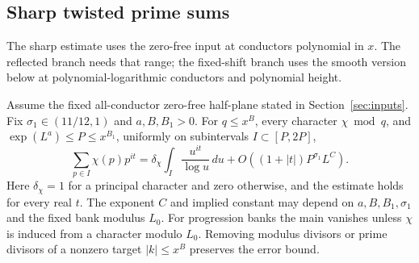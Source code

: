 \subsection{Sharp twisted prime sums}


The sharp estimate uses the zero-free input at conductors polynomial
in \(x\). The reflected branch needs that range; the fixed-shift
branch uses the smooth version below at polynomial-logarithmic
conductors and polynomial height.

\begin{lemma}\label{lem:gr-primes}
Assume the fixed all-conductor zero-free half-plane stated in
Section~\ref{sec:inputs}.
Fix \(\sigma_1\in(11/12,1)\) and \(a,B,B_1>0\).
For \(q\le x^B\), every character \(\chi\bmod q\), and
\(\exp(L^a)\le P\le x^{B_1}\), uniformly on subintervals
\(I\subset[P,2P]\),
\begin{equation}
 \sum_{p\in I}\chi(p)p^{it}
 =\delta_\chi\int_I\frac{u^{it}}{\log u}\,du
       +O((1+|t|)P^{\sigma_1}L^C).                  \label{eq:gr-primes}
\end{equation}
Here \(\delta_\chi=1\) for a principal character and zero otherwise,
and the estimate holds for every real \(t\). The exponent \(C\)
and implied constant may depend on \(a,B,B_1,\sigma_1\) and the
fixed bank modulus \(L_0\).
For progression banks the main vanishes unless \(\chi\) is induced
from a character modulo \(L_0\).
Removing modulus divisors or prime divisors of a nonzero target
\(|k|\le x^B\) preserves the error bound.
\end{lemma}

